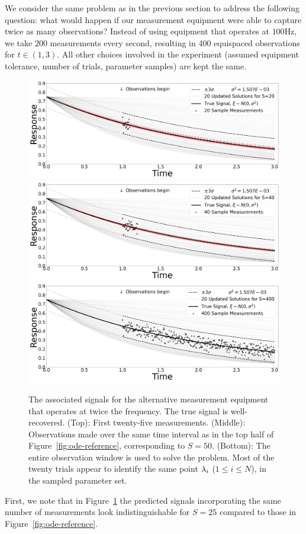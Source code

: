 We consider the same problem as in the previous section to address the following question: what would happen if our measurement equipment were able to capture twice as many observations?
Instead of using equipment that operates at $100$Hz, we take $200$ measurements every second, resulting in 400 equispaced observations for $t \in (1,3)$.
All other choices involved in the experiment (assumed equipment tolerance, number of trials, parameter samples) are kept the same.

\begin{figure}[htbp]
  \includegraphics[width=\linewidth]{figures/ode/ode-alt_20_reference_solution}
  \includegraphics[width=\linewidth]{figures/ode/ode-alt_40_reference_solution}
  \includegraphics[width=\linewidth]{figures/ode/ode-alt_400_reference_solution}
  \caption{The associated signals for the alternative measurement equipment that operates at twice the frequency.
  The true signal is well-recovered.
  (Top): First twenty-five measurements.
  (Middle): Observations made over the same time interval as in the top half of Figure~\ref{fig:ode-reference}, corresponding to $S=50$.
  (Bottom): The entire observation window is used to solve the problem. Most of the twenty trials appear to identify the same point $\lambda_i$ ($1\leq i \leq N$), in the sampled parameter set.
  }
  \label{fig:ode-alt-reference}
\end{figure}
First, we note that in Figure~\ref{fig:ode-alt-reference} the predicted signals incorporating the same number of measurements look indistinguishable for $S=25$ compared to those in Figure~\ref{fig:ode-reference}.



